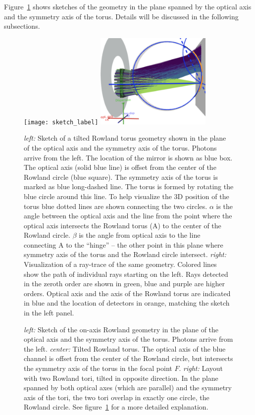 \documentclass[twocolumn]{aastex631}
\begin{document}
Figure~\ref{fig:sketch_label} shows sketches of the geometry in the plane spanned by the optical axis and the symmetry axis of the torus. Details will be discussed in the following subsections.
\begin{figure}
    \texttt{[image: sketch\_label]}
    \includegraphics[width=0.5\textwidth]{raytrace_labelled}
    \caption{\emph{left:} Sketch of a tilted Rowland torus geometry shown in the plane of the optical axis and the symmetry axis of the torus. Photons arrive from the left. The location of the mirror is shown as blue box. The optical axis (solid blue line) is offset from the center of the Rowland circle (blue square). The symmetry axis of the torus  is marked as blue long-dashed line. The torus is formed by rotating the blue circle around this line. To help visualize the 3D position of the torus blue dotted lines are shown connecting the two circles. $\alpha$ is the angle between the optical axis and the line from the point where the optical axis intersects the Rowland torus (A) to the center of the Rowland circle. $\beta$ is the angle from optical axis to the line connecting A to the ``hinge'' -- the other point in this plane where symmetry axis of the torus and the Rowland circle intersect.
    \emph{right:} Visualization of a ray-trace of the same geometry. Colored lines show the path of individual rays starting on the left. Rays detected in the zeroth order are shown in green, blue and purple are higher orders. Optical axis and the axis of the Rowland torus are indicated in blue and the location of detectors in orange, matching the sketch in the left panel.
        }
    \label{fig:sketch_label}
\end{figure}
\begin{figure}
    \caption{\emph{left:} Sketch of the on-axis Rowland geometry in the plane of the optical axis and the symmetry axis of the torus. Photons arrive from the left.
    \emph{center:} Tilted Rowland torus. The optical axis of the blue channel is offset from the center of the Rowland circle, but intersects the symmetry axis of the torus in the focal point $F$.
    \emph{right:} Layout with two Rowland tori, tilted in opposite direction. In the plane spanned by both optical axes (which are parallel) and the symmetry axis of the tori, the two tori overlap in exactly one circle, the Rowland circle. See figure~\ref{fig:sketch_label} for a more detailed explanation.
        }
    \label{fig:sketch}
\end{figure}
\end{document}

